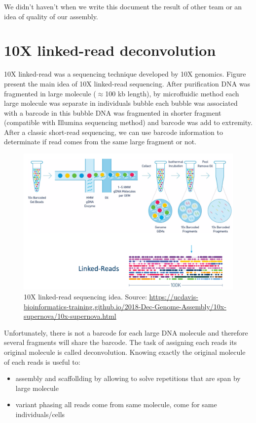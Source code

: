 \documentclass[main.tex]{subfiles}
\begin{document}
We didn't haven't when we write this document the result of other team or an idea of quality of our assembly.

\section{10X linked-read deconvolution}

10X linked-read was a sequencing technique developed by 10X genomics. Figure \label{fig:other_contribution:10x} present the main idea of 10X linked-read sequencing. After purification DNA was fragmented in large molecule ($\approx$100 kb length), by microfluidic method each large molecule was separate in individuals bubble each bubble was associated with a barcode in this bubble DNA was fragmented in shorter fragment (compatible with Illumina sequencing method) and barcode was add to extremity. After a classic short-read sequencing, we can use barcode information to determinate if read comes from the same large fragment or not.

\begin{figure}
    \centering
    \includegraphics[width=\textwidth]{other_contribution/images/Linked_reads.png}
    \caption{10X linked-read sequencing idea. Source: \url{https://ucdavis-bioinformatics-training.github.io/2018-Dec-Genome-Assembly/10x-supernova/10x-supernova.html}}
    \label{fig:other_contribution:10x}
\end{figure}

Unfortunately, there is not a barcode for each large DNA molecule and therefore several fragments will share the barcode. The task of assigning each reads its original molecule is called deconvolution. Knowing exactly the original molecule of each reads is useful to: 
\begin{itemize}
    \item assembly and scaffollding by allowing to solve repetitions that are span by large molecule
    \item variant phasing all reads come from same molecule, come for same individuals/cells
\end{itemize}
 
\end{document}

